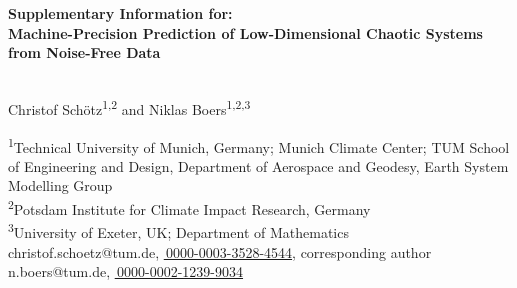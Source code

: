 \documentclass{article}
\newcommand{\orcidthanks}[1]{%
    \href{https://orcid.org/#1}{\raisebox{-0.5ex}{\usebox{\myorcidthanksbox}}\,#1}}
\begin{document}
\vspace*{2cm}
\begin{center}
    \begin{minipage}{\textwidth}
        \centering\LARGE\bfseries
        \setlength{\baselineskip}{1.25\baselineskip}
        Supplementary Information for:\\[0.3em]
        Machine-Precision Prediction of Low-Dimensional Chaotic Systems from Noise-Free Data
    \end{minipage}\\[1.5em]
    {\large Christof Sch\"otz\textsuperscript{1,2} and Niklas Boers\textsuperscript{1,2,3}}\\[1em]
    \begin{minipage}{0.9\textwidth}
        \centering\small
        \textsuperscript{1}Technical University of Munich, Germany; Munich Climate Center; TUM School of Engineering and Design, Department of Aerospace and Geodesy, Earth System Modelling Group\\
        \textsuperscript{2}Potsdam Institute for Climate Impact Research, Germany\\
        \textsuperscript{3}University of Exeter, UK; Department of Mathematics\\[0.8em]
        christof.schoetz@tum.de, \orcidthanks{0000-0003-3528-4544}, corresponding author\\
        n.boers@tum.de, \orcidthanks{0000-0002-1239-9034}
    \end{minipage}
\end{center}
\vspace{2em}

\renewcommand{\theequation}{S\arabic{equation}}
\renewcommand{\thefigure}{S\arabic{figure}}
\renewcommand{\thetable}{S\arabic{table}}
\renewcommand{\thesection}{S\arabic{section}}
\renewcommand{\thesubsection}{\thesection.\arabic{subsection}}
\renewcommand{\thetheorem}{\thesection.\arabic{theorem}}
\renewcommand{\thepage}{S\arabic{page}}
\end{document}
